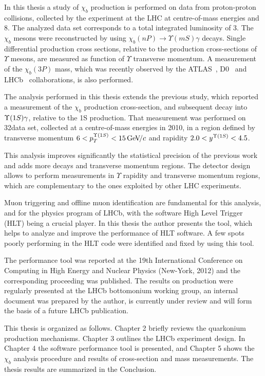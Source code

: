 In this thesis a study of $\chi_b$ production is performed on data from proton-proton collisions, 
collected by the \lhcb experiment at the LHC at centre-of-mass energies 
 and 8\tev. The analyzed data set corresponds to a total integrated luminosity
of 3\invfb. The $\chi_b$ mesons were reconstructed by using 
$\chi_b(nP)\rightarrow\Upsilon(mS)\gamma$ decays. Single differential
production cross sections, relative to the production cross-sections of
$\Upsilon$ mesons, are measured as function of $\Upsilon$ transverse momentum.
A measurement of the $\chi_b(3P)$ mass, which was recently observed by the 
ATLAS~\cite{Aad:2011ih}, D0~\cite{Abazov:2012gh} and
LHCb~\cite{LHCb-CONF-2012-020} collaborations, is also performed.

The analysis performed in this thesis extends the previous \lhcb
study\cite{LHCb-PAPER-2012-015}, which reported a measurement of the $\chi_b$
production cross-section, and subsequent decay into $\Y1S \gamma$, relative
to the \Y1S production. That measurement was performed on 32\invpb data set,
collected at a centre-of-mass energies \tev in 2010,  in a region defined by
transverse momentum $6  < p_{T}^{\Y1S} < 15 \gevc$ and rapidity  $2.0 <
y^{\Y1S} < 4.5$. 

This analysis improves significantly the statistical precision of the previous work and 
adds more decays and transverse momentum regions. The
\lhcb detector design allows to perform measurements in $\Upsilon$ rapidity and 
transverse momentum regions, which are complementary to the ones exploited 
by other LHC experiments. 

Muon triggering and offline muon identification are fundamental for this analysis, and 
for the physics program of LHCb, with the software High Level Trigger (HLT) being 
a crucial player. In this thesis the author presents the tool, which helps to
analyze and improve the performance of HLT software. A few spots poorly performing 
in the HLT code were identified and fixed by using this tool.

The performance tool was reported at the 19th International
Conference on Computing in High Energy and Nuclear Physics (New-York, 2012) and
the corresponding proceeding was published\cite{aprofiler}. The results on
\chib production were regularly presented at the LHCb bottomonium working group,
an internal document was prepared by the author, is currently under review and will form 
the basis of a future LHCb publication.

This thesis is organized as follows. 
Chapter 2 briefly reviews the quarkonium production mechanisms. Chapter 3
outlines the LHCb experiment design. In Chapter 4 the software performance tool 
is presented, and Chapter 5 shows the $\chi_b$ analysis procedure and
results of cross-section and \chibThreeP mass measurements. The thesis results are 
summarized in the Conclusion. 
